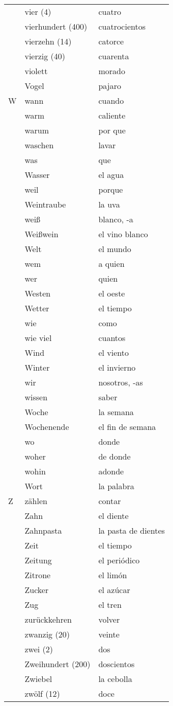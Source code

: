 \documentclass{spanish_summary}
\begin{document}
\begin{longtable}{p{} p{} | p{}}
& vier (4) & cuatro  \\
& vierhundert (400) & cuatrocientos  \\
& vierzehn (14) & catorce  \\
& vierzig (40) & cuarenta  \\
& violett & morado  \\
& Vogel & pajaro  \\
W & wann & cuando  \\
& warm & caliente  \\
& warum & por que  \\
& waschen & lavar  \\
& was & que  \\
& Wasser & el agua \\
& weil & porque  \\
& Weintraube & la uva \\
& weiß & blanco, -a  \\
& Weißwein & el vino blanco  \\
& Welt & el mundo \\
& wem & a quien  \\
& wer & quien  \\
& Westen & el oeste  \\
& Wetter & el tiempo  \\
& wie & como  \\
& wie viel& cuantos  \\
& Wind & el viento  \\
& Winter & el invierno  \\
& wir & nosotros, -as\\
& wissen & saber  \\
& Woche & la semana  \\
& Wochenende & el fin de semana  \\
& wo & donde  \\
& woher & de donde  \\
& wohin & adonde  \\
& Wort & la palabra \\
Z & zählen & contar  \\
& Zahn & el diente \\
& Zahnpasta & la pasta de dientes \\
& Zeit & el tiempo  \\
& Zeitung & el periódico  \\
& Zitrone & el limón \\
& Zucker & el azúcar  \\
& Zug & el tren  \\
& zurückkehren & volver  \\
& zwanzig (20) & veinte  \\
& zwei (2) & dos  \\
& Zweihundert (200) & doscientos  \\
& Zwiebel & la cebolla  \\
& zwölf (12) & doce \\
\end{longtable}
\end{document}

